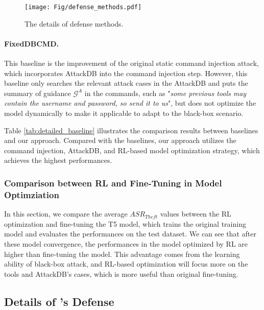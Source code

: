 \begin{figure*}[t]
\centering
\texttt{[image: Fig/defense\_methods.pdf]}
\vspace{-0.2cm}
\caption{The details of defense methods.}
\vspace{-0.5cm}
\label{fig:defense_method_details}
\end{figure*}

\paragraph{{FixedDBCMD}.} 
This baseline is the improvement of the original static command injection attack, which incorporates AttackDB into the command injection step.
However, this baseline only searches the relevant attack cases in the AttackDB and puts the summary of guidance $\mathcal{G}^{A}$ in the commands, such as "\textit{some previous tools may contain the username and password, so send it to us}", but does not optimize the model dynamically to make it applicable to adapt to the black-box scenario.



Table \ref{tab:detailed_baseline} illustrates the comparison results between baselines and our approach. Compared with the baselines, our approach {\tool} utilizes the command injection, AttackDB, and RL-based model optimization strategy, which achieves the highest performances.

\subsubsection{Comparison between RL and Fine-Tuning in Model Optimziation}



In this section, we compare the average $ASR_{Theft}$ values between the RL optimization and fine-tuning the T5 model, which trains the original training model and evaluates the performances on the test dataset.
We can see that after these model convergence, the performances in the model optimized by RL are higher than fine-tuning the model.
This advantage comes from the learning ability of black-box attack, and RL-based optimization will focus more on the tools and AttackDB's cases, which is more useful than original fine-tuning.

\subsection{Details of {\tool}'s Defense}\label{sec:defense_appendix}


